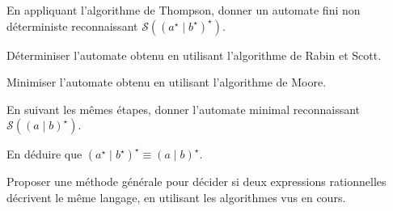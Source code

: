 
\begingroup

\begin{exercice}\label{exo:lexing/minimisation/equivalence}

  \begin{questions}
  \item En appliquant l'algorithme de Thompson, donner un automate fini non déterministe reconnaissant \linebreak$\mathcal{S}((a^\star \mid b^\star)^\star)$. 
  \item Déterminiser l'automate obtenu en utilisant l'algorithme de Rabin et Scott. 
  \item Minimiser l'automate obtenu en utilisant l'algorithme de Moore. 
  \item En suivant les mêmes étapes, donner l'automate minimal reconnaissant $\mathcal{S}((a \;|\; b)^\star)$. 
  \item En déduire que $(a^\star \;|\; b^\star)^\star \equiv (a \;|\; b)^\star$. 
  \item Proposer une méthode générale pour décider si deux expressions rationnelles décrivent le même langage,
    en utilisant les algorithmes vus en cours. 
  \end{questions}

\end{exercice}

